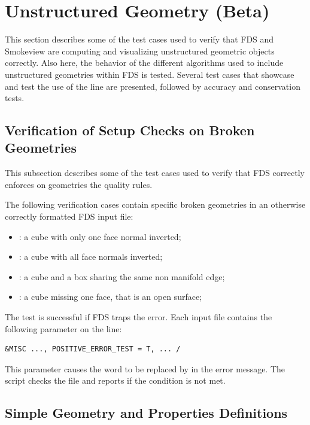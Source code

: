 \documentclass[11pt]{book}
\begin{document}

\ifcompgeom

\chapter{Unstructured Geometry (Beta)}

This section describes some of the test cases used to verify that FDS and Smokeview are computing
and visualizing unstructured geometric objects correctly. Also here, the behavior of the different
algorithms used to include unstructured geometries within FDS is tested. Several test cases that showcase
and test the use of the  line are presented, followed by accuracy and conservation tests.


\section{Verification of Setup Checks on Broken Geometries}

This subsection describes some of the test cases used to verify that FDS correctly enforces on geometries
the quality rules.

The following verification cases contain specific broken geometries in an otherwise correctly
formatted FDS input file:
\begin{itemize}
  \item {}: a cube with only one face normal inverted;
  \item {}: a cube with all face normals inverted;
  \item {}: a cube and a box sharing the same non manifold edge;
  \item {}: a cube missing one face, that is an open surface;
\end{itemize}
The test is successful if FDS traps the error. Each input file contains the following parameter on the  line:
\begin{lstlisting}
&MISC ..., POSITIVE_ERROR_TEST = T, ... /
\end{lstlisting}
This parameter causes the word  to be replaced by  in the error message. The script  checks the  file and reports if the condition is not met.


\newpage

\section{Simple Geometry and Properties Definitions}
\end{document}
